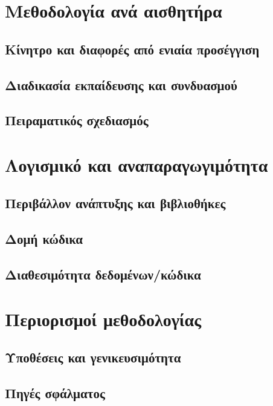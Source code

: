 \section{Μεθοδολογία ανά αισθητήρα}
\subsection{Κίνητρο και διαφορές από ενιαία προσέγγιση}
\subsection{Διαδικασία εκπαίδευσης και συνδυασμού}
\subsection{Πειραματικός σχεδιασμός}

\section{Λογισμικό και αναπαραγωγιμότητα}
\subsection{Περιβάλλον ανάπτυξης και βιβλιοθήκες}
\subsection{Δομή κώδικα}
\subsection{Διαθεσιμότητα δεδομένων/κώδικα}

\section{Περιορισμοί μεθοδολογίας}
\subsection{Υποθέσεις και γενικευσιμότητα}
\subsection{Πηγές σφάλματος}

